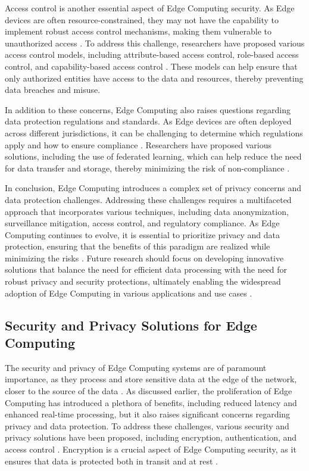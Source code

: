 \documentclass[11pt,a4paper]{article}
\begin{document}
Access control is another essential aspect of Edge Computing security. As Edge devices are often resource-constrained, they may not have the capability to implement robust access control mechanisms, making them vulnerable to unauthorized access \cite{arxiv:2107.13374}. To address this challenge, researchers have proposed various access control models, including attribute-based access control, role-based access control, and capability-based access control \cite{arxiv:2106.10063}. These models can help ensure that only authorized entities have access to the data and resources, thereby preventing data breaches and misuse.

In addition to these concerns, Edge Computing also raises questions regarding data protection regulations and standards. As Edge devices are often deployed across different jurisdictions, it can be challenging to determine which regulations apply and how to ensure compliance \cite{arxiv:2111.10076}. Researchers have proposed various solutions, including the use of federated learning, which can help reduce the need for data transfer and storage, thereby minimizing the risk of non-compliance \cite{arxiv:2502.11644}.

In conclusion, Edge Computing introduces a complex set of privacy concerns and data protection challenges. Addressing these challenges requires a multifaceted approach that incorporates various techniques, including data anonymization, surveillance mitigation, access control, and regulatory compliance. As Edge Computing continues to evolve, it is essential to prioritize privacy and data protection, ensuring that the benefits of this paradigm are realized while minimizing the risks \cite{arxiv:2309.03420}. Future research should focus on developing innovative solutions that balance the need for efficient data processing with the need for robust privacy and security protections, ultimately enabling the widespread adoption of Edge Computing in various applications and use cases \cite{arxiv:2309.05416}.


\subsection{Security and Privacy Solutions for Edge Computing}


The security and privacy of Edge Computing systems are of paramount importance, as they process and store sensitive data at the edge of the network, closer to the source of the data \cite{arxiv:1807.00976}. As discussed earlier, the proliferation of Edge Computing has introduced a plethora of benefits, including reduced latency and enhanced real-time processing, but it also raises significant concerns regarding privacy and data protection. To address these challenges, various security and privacy solutions have been proposed, including encryption, authentication, and access control \cite{arxiv:2206.07164}. Encryption is a crucial aspect of Edge Computing security, as it ensures that data is protected both in transit and at rest \cite{arxiv:1810.13287}.
\end{document}
